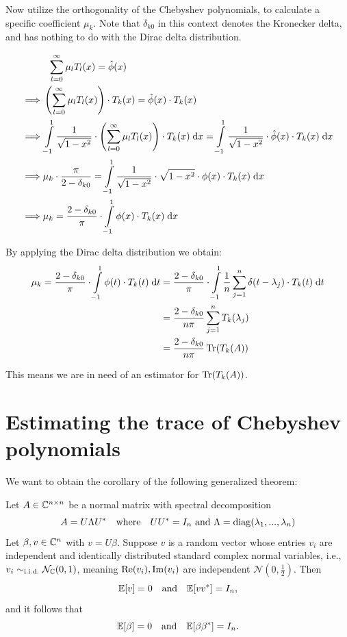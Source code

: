 Now utilize the orthogonality of the Chebyshev polynomials, to calculate a specific coefficient $\mu_k$.
Note that $\delta_{k0}$ in this context denotes the Kronecker delta, and has nothing to do with the Dirac delta distribution.

\begin{align*}
    & \; \; \sum_{l = 0}^{\infty} \mu_l T_l(x) = \hat{\phi}(x) \\
    \implies & \left(\sum_{l = 0}^{\infty} \mu_l T_l(x)\right) \cdot T_k(x) = \hat{\phi}(x) \cdot T_k(x)\\
    \implies & \int\limits_{-1}^1 \frac{1}{\sqrt{1 - x^2}} \cdot \left(\sum_{l = 0}^{\infty} \mu_l T_l(x)\right) \cdot T_k(x) \;\mathrm{d}x = \int\limits_{-1}^1 \frac{1}{\sqrt{1 - x^2}} \cdot \hat{\phi}(x) \cdot T_k(x) \;\mathrm{d}x\\
    \implies & \mu_k \cdot \frac{\pi}{2 - \delta_{k0}} = \int\limits_{-1}^1 \frac{1}{\sqrt{1 - x^2}} \cdot \sqrt{1 - x^2} \cdot \phi(x) \cdot T_k(x) \;\mathrm{d}x\\
    \implies & \mu_k = \frac{2 - \delta_{k0}}{\pi} \cdot \int\limits_{-1}^1 \phi(x) \cdot T_k(x) \;\mathrm{d}x\\
\end{align*}

By applying the Dirac delta distribution we obtain:
\begin{align*}
    \mu_k = \frac{2 - \delta_{k0}}{\pi} \cdot \int\limits_{-1}^1 \phi(t) \cdot T_k(t) \;\mathrm{d}t &= \frac{2 - \delta_{k0}}{\pi} \cdot \int\limits_{-1}^1 \frac{1}{n} \sum_{j = 1}^n \delta(t - \lambda_j) \cdot T_k(t) \;\mathrm{d}t \\
    &= \frac{2 - \delta_{k0}}{n \pi} \sum_{j = 1}^n T_k(\lambda_j)\\
    &= \frac{2 - \delta_{k0}}{n \pi} \operatorname{Tr}(T_k(A))
\end{align*}

This means we are in need of an estimator for $\operatorname{Tr}(T_k(A))$.

\section{Estimating the trace of Chebyshev polynomials}

We want to obtain the corollary of the following generalized theorem:

\begin{theorem}
    Let $A \in \mathbb{C}^{n \times n}$ be a normal matrix with spectral decomposition
    \[
    A = U \Lambda U^* \quad \text{where} \quad UU^* = I_n \text{ and } \Lambda = \operatorname{diag}(\lambda_1, ..., \lambda_n)
    \]
    Let $\beta, v \in \mathbb{C}^n$ with $v = U\beta$.
    Suppose $v$ is a random vector whose entries $v_i$ are independent and identically distributed standard complex normal variables,
    i.e., $v_i \sim_\text{i.i.d.} \mathcal{N}_{\mathbb{C}}(0, 1)$, meaning $\operatorname{Re}(v_i), \operatorname{Im}(v_i)$ are independent $\mathcal{N}(0, \frac{1}{2})$.
    Then
    \begin{equation} \label{eq:complex_normal_vector}
        \mathbb{E}[v] = 0 \quad \text{and} \quad \mathbb{E}[v v^*] = I_n,
    \end{equation}
    and it follows that
    \[
    \mathbb{E}[\beta] = 0 \quad \text{and} \quad \mathbb{E}[\beta \beta^*] = I_n.
    \]
\end{theorem}


